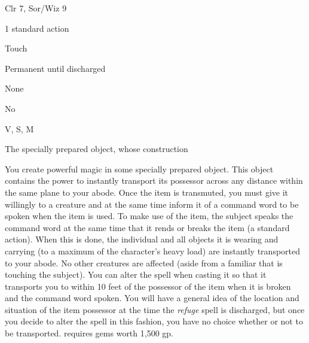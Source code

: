 
\begin{description*}
\item[Level:] Clr 7, Sor/Wiz 9
\item[Casting Time:] 1 standard action
\item[Range:] Touch
\item[Duration:] Permanent until discharged
\item[Saving Throw:] None
\item[Spell Resistance:] No
\item[Components:] V, S, M
\item[Arcane Material Component:] The specially prepared object, whose construction
\end{description*}

You create powerful magic in some specially prepared object. This object contains
the power to instantly transport its possessor across any distance within the same
plane to your abode. Once the item is transmuted, you must give it willingly to
a creature and at the same time inform it of a command word to be spoken when the
item is used. To make use of the item, the subject speaks the command word at the
same time that it rends or breaks the item (a standard action). When this is done,
the individual and all objects it is wearing and carrying (to a maximum of the
character's heavy load) are instantly transported to your abode. No other creatures
are affected (aside from a familiar that is touching the subject).
You can alter the spell when casting it so that it transports you to within 10
feet of the possessor of the item when it is broken and the command word spoken.
You will have a general idea of the location and situation of the item possessor
at the time the \textit{refuge} spell is discharged, but once you decide to alter
the spell in this fashion, you have no choice whether or not to be transported.
requires gems worth 1,500 gp.